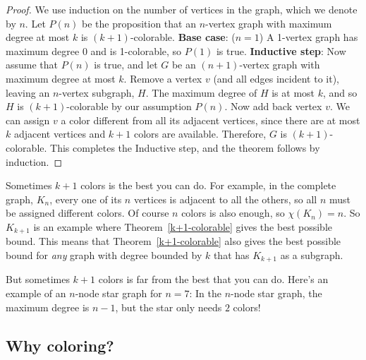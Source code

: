 \begin{proof}
We use induction on the number of vertices in the graph, which we
denote by $n$.  Let $P(n)$ be the proposition that an $n$-vertex graph
with maximum degree at most $k$ is $(k+1)$-colorable.
\textbf{Base case}: ($n=1$) A 1-vertex graph has maximum degree 0 and is
1-colorable, so $P(1)$ is true.
\textbf{Inductive step}: Now assume that $P(n)$ is true, and let $G$ be an
$(n+1)$-vertex graph with maximum degree at most $k$.  Remove a vertex $v$
(and all edges incident to it), leaving an $n$-vertex subgraph, $H$.  The
maximum degree of $H$ is at most $k$, and so $H$ is $(k+1)$-colorable by
our assumption $P(n)$.  Now add back vertex $v$.  We can assign $v$ a
color different from all its adjacent vertices, since there are at
most $k$ adjacent vertices and $k+1$ colors are available.  Therefore, $G$
is $(k+1)$-colorable.  This completes the Inductive step, and the theorem
follows by induction.
\end{proof}

Sometimes $k+1$ colors is the best you can do.  For example, in the
complete graph, $K_n$, every one of its $n$ vertices is adjacent to all
the others, so all $n$ must be assigned different colors.  Of course $n$
colors is also enough, so $\chi(K_n)=n$.  So $K_{k+1}$ is an example where
Theorem~\ref{k+1-colorable} gives the best possible bound.  This means
that Theorem~\ref{k+1-colorable} also gives the best possible bound for
\emph{any} graph with degree bounded by $k$ that has $K_{k+1}$ as a
subgraph.

But sometimes $k+1$ colors is far from the best that you can do.  Here's
an example of an $n$-node star graph for $n=7$:
In the $n$-node star graph, the maximum degree is $n-1$, but the star only
needs $2$ colors!

\subsection{Why coloring?}


